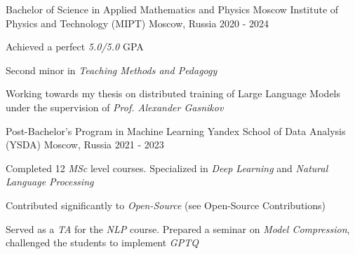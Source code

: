 
\begin{cventries}
  \cventry
    {Bachelor of Science in Applied Mathematics and Physics} %
    {Moscow Institute of Physics and Technology (MIPT)} %
    {Moscow, Russia} %
    {2020 - 2024} %
    {
        \begin{cvitems}
         \item { Achieved a perfect \textit{5.0/5.0} GPA }
         \item { Second minor in \textit{Teaching Methods and Pedagogy} }
         \item { Working towards my thesis on distributed training of Large Language Models under the supervision of \textit{Prof. Alexander Gasnikov} }
        \end{cvitems}
    }
    
  \cventry
    {Post-Bachelor's Program in Machine Learning} %
    {Yandex School of Data Analysis (YSDA)}
    {Moscow, Russia}
    {2021 - 2023}
    {
      \begin{cvitems} %
        \item { Completed 12 \textit{MSc} level courses. Specialized in \textit{Deep Learning} and \textit{Natural Language Processing} }
        \item { Contributed significantly to \textit{Open-Source} (see Open-Source Contributions)}
        \item { Served as a \textit{TA} for the \textit{NLP} course. Prepared a seminar on \textit{Model Compression}, challenged the students to implement \textit{GPTQ} }
      \end{cvitems}
    }
\end{cventries}
